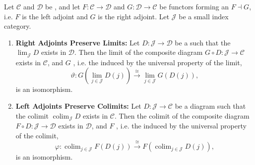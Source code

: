 \begin{theorem} \label{theorem:right_left_adjoints_commute_with_limits_colimits_of_small_diagrams}
    Let $\mathcal{C}$ and $\mathcal{D}$ be , and let $F: \mathcal{C} \to \mathcal{D}$ and $G: \mathcal{D} \to \mathcal{C}$ be functors forming an  $F \dashv G$, i.e. $F$ is the left adjoint and $G$ is the right adjoint. Let $\mathcal{J}$ be a small index category.

    \begin{enumerate}
        \item \textbf{Right Adjoints Preserve Limits:}
        Let $D: \mathcal{J} \to \mathcal{D}$ be a  such that the  $\lim_{\mathcal{J}} D$ exists in $\mathcal{D}$. Then the limit of the composite diagram $G \circ D: \mathcal{J} \to \mathcal{C}$ exists in $\mathcal{C}$, and $G$ , i.e. the  induced by the universal property of the limit,
        $$
        \vartheta: G\left(\lim_{j \in \mathcal{J}} D(j)\right) \xrightarrow{\cong} \lim_{j \in \mathcal{J}} G(D(j)),
        $$
        is an isomorphism.

        \item \textbf{Left Adjoints Preserve Colimits:}
        Let $D: \mathcal{J} \to \mathcal{C}$ be a diagram such that the colimit $\operatorname{colim}_{\mathcal{J}} D$ exists in $\mathcal{C}$. Then the colimit of the composite diagram $F \circ D: \mathcal{J} \to \mathcal{D}$ exists in $\mathcal{D}$, and $F$ , i.e. the  induced by the universal property of the colimit,
        $$
        \varphi: \operatorname{colim}_{j \in \mathcal{J}} F(D(j)) \xrightarrow{\cong} F\left(\operatorname{colim}_{j \in \mathcal{J}} D(j)\right),
        $$
        is an isomorphism.
    \end{enumerate}
\end{theorem}